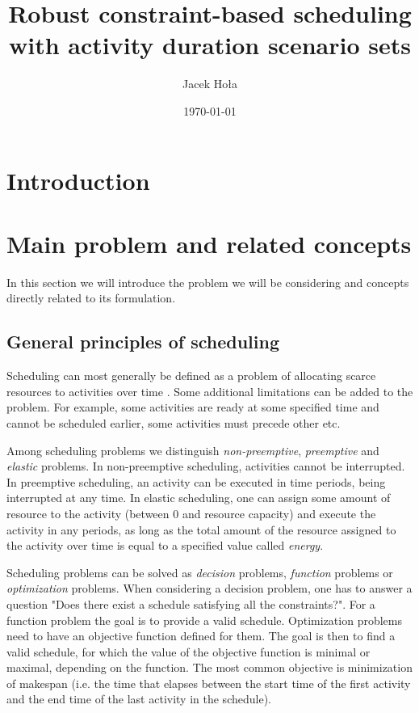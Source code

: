 \documentclass{article}
\theoremstyle{definition}
\begin{document}
 

\title{Robust constraint-based scheduling with activity duration scenario sets}
\author{Jacek Hoła}
\date{\today}
\maketitle
\newpage

\tableofcontents
\newpage

\section{Introduction}

\section{Main problem and related concepts}
In this section we will introduce the problem we will be considering and concepts directly related to its formulation.


\subsection{General principles of scheduling}
Scheduling can most generally be defined as a problem of allocating scarce resources to activities over time \cite{Baker:Introduction}. 
Some additional limitations can be added to the problem. For example, some activities are ready at some specified time and cannot be scheduled earlier, some activities must precede other etc.

Among scheduling problems we distinguish \textit{non-preemptive}, \textit{preemptive} and \textit{elastic} problems. In non-preemptive scheduling, activities cannot be interrupted. In preemptive scheduling, an activity can be executed in time periods, being interrupted at any time. In elastic scheduling, one can assign some amount of resource to the activity (between 0 and resource capacity) and execute the activity in any periods, as long as the total amount of the resource assigned to the activity over time is equal to a specified value called \textit{energy}.

Scheduling problems can be solved as \textit{decision} problems, \textit{function} problems or \textit{optimization} problems. When considering a decision problem, one has to answer a question "Does there exist a schedule satisfying all the constraints?". For a function problem the goal is to provide a valid schedule. Optimization problems need to have an objective function defined for them. The goal is then to find a valid schedule, for which the value of the objective function is minimal or maximal, depending on the function. The most common objective is minimization of makespan (i.e. the time that elapses between the start time of the first activity and the end time of the last activity in the schedule).
\end{document}
